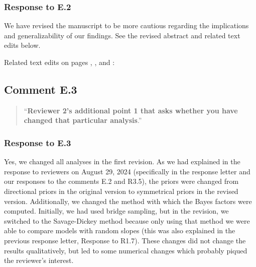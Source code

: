 \documentclass[12pt]{article}
\begin{document}
\subsubsection*{Response to E.2}
We have revised the manuscript to be more cautious regarding the implications and generalizability of our findings. See the revised abstract and related text edits below.

\begin{quote}
\end{quote}

\noindent Related text edits on pages \pageref{thisdesign1}, \pageref{synsem}, \pageref{thisdesign2} and \pageref{thisdesign3}:

\begin{quote}
\end{quote}

\begin{quote}
\end{quote}

\begin{quote}
\end{quote}

\begin{quote}
\end{quote}


\subsection*{Comment E.3}
\begin{quote}
``\textbf{Reviewer 2's additional point 1 that asks whether you have changed that particular analysis}.''
\end{quote}

\subsubsection*{Response to E.3}
Yes, we changed all analyses in the first revision. As we had explained in the response to reviewers on August 29, 2024 (specifically in the response letter and our responses to the comments E.2 and R3.5), the priors were changed from directional priors in the original version to symmetrical priors in the revised version. Additionally, we changed the method with which the Bayes factors were computed. Initially, we had used bridge sampling, but in the revision, we switched to the Savage-Dickey method because only using that method we were able to compare models with random slopes (this was also explained in the previous response letter, Response to R1.7). These changes did not change the results qualitatively, but led to some numerical changes which probably piqued the reviewer's interest.
\end{document}
